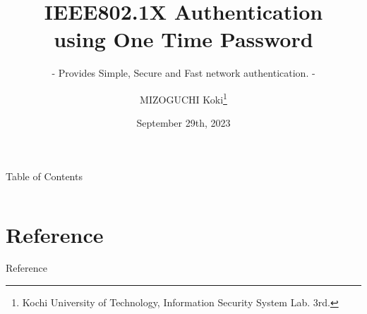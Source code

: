 \documentclass[aspectratio=43]{beamer}
\title{IEEE802.1X Authentication\\ using One Time Password}
\subtitle{- Provides Simple, Secure and Fast network authentication. -}
\author[K.MIZOGUCHI]{MIZOGUCHI Koki\thanks{Kochi University of Technology, Information Security System Lab. 3rd.}}
\date{September 29th, 2023}
\newcommand{\stoc}{1-4}
\newcommand{\ftoc}{5-7}
\begin{document}
\maketitle

\begin{frame}[t]{Table of Contents}
    \begin{columns}[t]
        \begin{column}{.48\textwidth}
            \tableofcontents[sections=\stoc]
        \end{column}
        \begin{column}{.48\textwidth}
            \tableofcontents[sections=\ftoc]
        \end{column}
    \end{columns}
\end{frame}









\section{Reference}
\begin{frame}[allowframebreaks]{Reference}
    \printbibliography
\end{frame}
\end{document}
